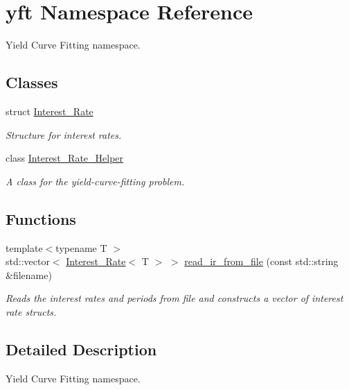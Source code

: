 \hypertarget{namespaceyft}{}\section{yft Namespace Reference}
\label{namespaceyft}


Yield Curve Fitting namespace.  


\subsection*{Classes}
\begin{DoxyCompactItemize}
\item 
struct \hyperlink{structyft_1_1_interest___rate}{Interest\+\_\+\+Rate}
\begin{DoxyCompactList}\small\item\em Structure for interest rates. \end{DoxyCompactList}\item 
class \hyperlink{classyft_1_1_interest___rate___helper}{Interest\+\_\+\+Rate\+\_\+\+Helper}
\begin{DoxyCompactList}\small\item\em A class for the yield-\/curve-\/fitting problem. \end{DoxyCompactList}\end{DoxyCompactItemize}
\subsection*{Functions}
\begin{DoxyCompactItemize}
\item 
{\footnotesize template$<$typename T $>$ }\\std\+::vector$<$ \hyperlink{structyft_1_1_interest___rate}{Interest\+\_\+\+Rate}$<$ T $>$ $>$ \hyperlink{namespaceyft_a5e004e321696f199f8cf25b1dc604108}{read\+\_\+ir\+\_\+from\+\_\+file} (const std\+::string \&filename)
\begin{DoxyCompactList}\small\item\em Reads the interest rates and periods from file and constructs a vector of interest rate structs. \end{DoxyCompactList}\end{DoxyCompactItemize}


\subsection{Detailed Description}
Yield Curve Fitting namespace. 

